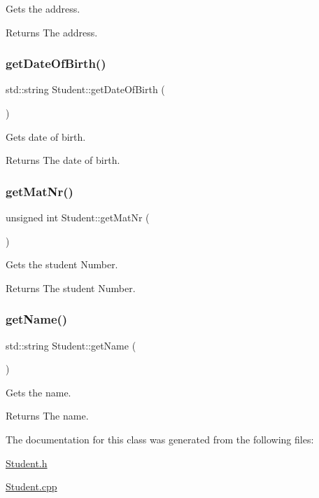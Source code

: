 Gets the address. 

\begin{DoxyReturn}{Returns}
The address. 
\end{DoxyReturn}
\mbox{\label{class_student_a9c46502480d94c46865eee494f96bfe0}} 
\subsubsection{\texorpdfstring{get\+Date\+Of\+Birth()}{getDateOfBirth()}}
{\footnotesize\ttfamily std\+::string Student\+::get\+Date\+Of\+Birth (\begin{DoxyParamCaption}{ }\end{DoxyParamCaption})}



Gets date of birth. 

\begin{DoxyReturn}{Returns}
The date of birth. 
\end{DoxyReturn}
\mbox{\label{class_student_a2f996798d6c9b904e3abf902f68d3c0b}} 
\subsubsection{\texorpdfstring{get\+Mat\+Nr()}{getMatNr()}}
{\footnotesize\ttfamily unsigned int Student\+::get\+Mat\+Nr (\begin{DoxyParamCaption}{ }\end{DoxyParamCaption})}



Gets the student Number. 

\begin{DoxyReturn}{Returns}
The student Number. 
\end{DoxyReturn}
\mbox{\label{class_student_a729c900a0e95c46f90668f527a72ad34}} 
\subsubsection{\texorpdfstring{get\+Name()}{getName()}}
{\footnotesize\ttfamily std\+::string Student\+::get\+Name (\begin{DoxyParamCaption}{ }\end{DoxyParamCaption})}



Gets the name. 

\begin{DoxyReturn}{Returns}
The name. 
\end{DoxyReturn}


The documentation for this class was generated from the following files\+:\begin{DoxyCompactItemize}
\item 
\hyperlink{_student_8h}{Student.\+h}\item 
\hyperlink{_student_8cpp}{Student.\+cpp}\end{DoxyCompactItemize}
